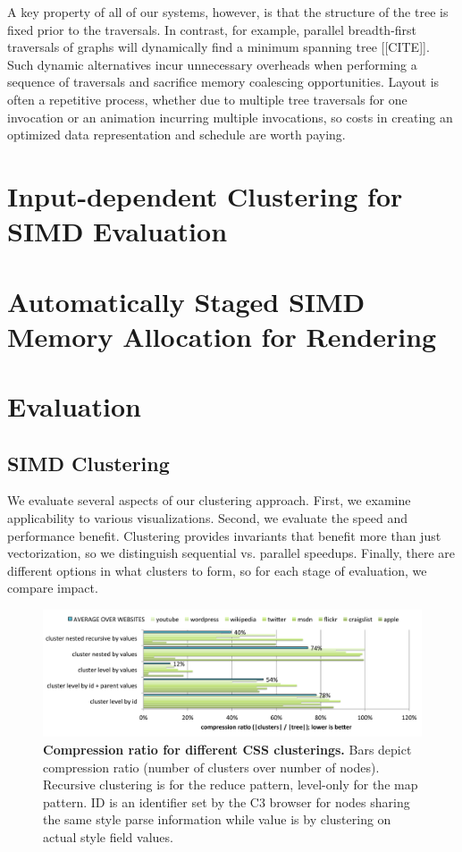 A key property of all of our systems, however, is that the structure of the tree is fixed prior to the traversals.  In contrast, for example, parallel breadth-first traversals of graphs will dynamically find a minimum spanning tree [[CITE]]. Such dynamic alternatives incur unnecessary overheads when performing a sequence of traversals and sacrifice memory coalescing opportunities. Layout is often a repetitive process, whether due to multiple tree traversals for one invocation or an animation incurring multiple invocations, so costs in creating an optimized data representation and schedule are worth paying.

\section{Input-dependent Clustering for SIMD Evaluation}


\section{Automatically Staged SIMD Memory Allocation for Rendering}



\section{Evaluation}


\subsection{SIMD Clustering}
We evaluate several aspects of our clustering approach. First, we examine applicability to various visualizations. Second, we evaluate the speed and performance benefit. Clustering provides invariants that benefit more than just vectorization, so we distinguish sequential vs. parallel speedups. Finally, there are different options in what clusters to form, so for each stage of evaluation, we compare impact.

\begin{figure}
\centering
\includegraphics[trim=0 0 0 0,clip,width=1.0\columnwidth]{chapter6/csscompression}
\caption{\textbf{Compression ratio for different CSS clusterings.} Bars depict compression ratio (number of clusters over number of nodes). Recursive clustering is for the reduce pattern, level-only for the map pattern. ID is an identifier set by the C3 browser for nodes sharing the same style parse information while value is by clustering on actual style field values.}
\label{fig:csscompression}
\end{figure}




